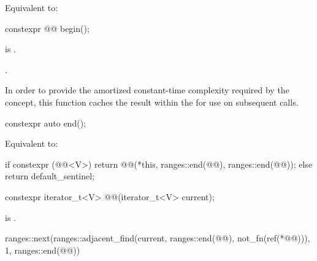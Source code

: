 \begin{itemdescr}
\pnum
\effects
Equivalent to: 
\end{itemdescr}

%
\begin{itemdecl}
constexpr @@ begin();
\end{itemdecl}

\begin{itemdescr}
\pnum
\expects
{} is .

\pnum
\returns
{}.

\pnum
\remarks
In order to provide
the amortized constant-time complexity required by the  concept,
this function caches the result within the 
for use on subsequent calls.
\end{itemdescr}

%
\begin{itemdecl}
constexpr auto end();
\end{itemdecl}

\begin{itemdescr}
\pnum
\effects
Equivalent to:
\begin{codeblock}
if constexpr (@@<V>) {
  return @@(*this, ranges::end(@@), ranges::end(@@));
} else {
  return default_sentinel;
}
\end{codeblock}
\end{itemdescr}

%
\begin{itemdecl}
constexpr iterator_t<V> @@(iterator_t<V> current);
\end{itemdecl}

\begin{itemdescr}
\pnum
\expects
{} is .

\pnum
\returns
\begin{codeblock}
ranges::next(ranges::adjacent_find(current, ranges::end(@@), not_fn(ref(*@@))),
             1, ranges::end(@@))
\end{codeblock}
\end{itemdescr}

